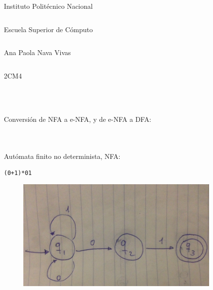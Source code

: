 \documentclass[addressstd,a4paper,10pt]{dinbrief}
\begin{document}
Instituto Polit\'ecnico Nacional
\begin{lstlisting}
\end{lstlisting}
Escuela Superior de C\'omputo
\begin{lstlisting}
\end{lstlisting}
Ana Paola Nava Vivas
\begin{lstlisting}
\end{lstlisting}
2CM4

\begin{lstlisting}
\end{lstlisting}
\begin{lstlisting}
\end{lstlisting}
\begin{lstlisting}
\end{lstlisting}
\begin{lstlisting}
\end{lstlisting}
Conversi\'on de NFA a e-NFA, y de e-NFA a DFA:
\begin{lstlisting}
\end{lstlisting}
\begin{lstlisting}
\end{lstlisting}
\begin{lstlisting}
\end{lstlisting}

Aut\'omata finito no determinista, NFA:
\begin{lstlisting}
(0+1)*01
\end{lstlisting}


\begin{center}
\begin{figure}
\includegraphics[width=0.9\textwidth]{NFA.png} 
\centering
\end{figure}
\end{center}
\end{document}
